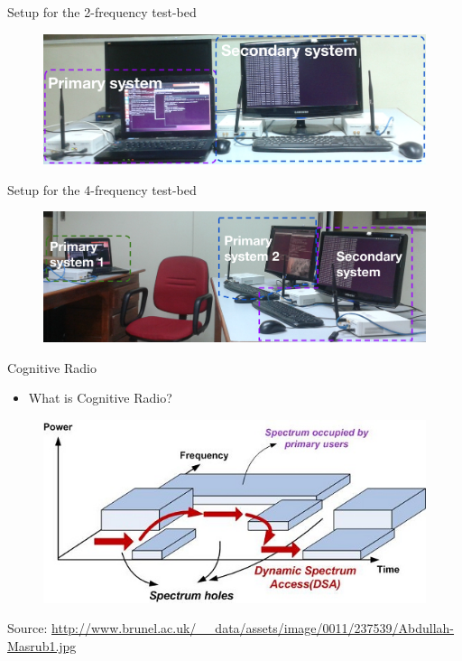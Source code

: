\documentclass{beamer}
\begin{document}
  \begin{frame}{Setup for the 2-frequency test-bed}
    \begin{figure}
      \centering
      \includegraphics[width=\linewidth]{img/freq2}
    \end{figure}
  \end{frame}
  
  \begin{frame}{Setup for the 4-frequency test-bed}
    \begin{figure}
      \centering
      \includegraphics[width=\linewidth]{img/freq4}
    \end{figure}
  \end{frame}
    
  \begin{frame}{Cognitive Radio}
    \begin{minipage}[t][0.8\textheight][t]{\textwidth}
      \begin{itemize}
        \item What is Cognitive Radio?
      \end{itemize}
      \begin{figure}
        \centering
        \includegraphics[width=\linewidth]{img/freqUtil}
      \end{figure}
      \vfill
      \tiny{Source: \url{http://www.brunel.ac.uk/\_\_data/assets/image/0011/237539/Abdullah-Masrub1.jpg}}
    \end{minipage}
  \end{frame}
\end{document}
